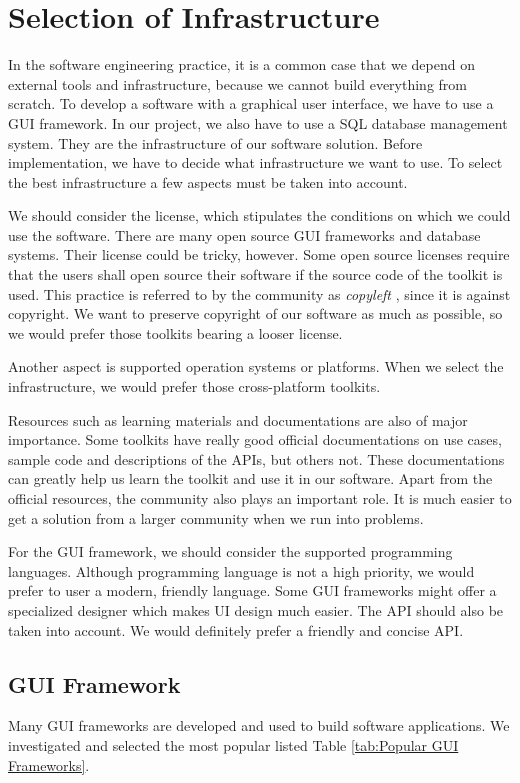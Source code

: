 \chapter{Selection of Infrastructure\label{ch:Selection of Infrastructure}}
In the software engineering practice, it is a common case that we depend on external tools and infrastructure, because we cannot build everything from scratch. To develop a software with a graphical user interface, we have to use a GUI framework. In our project, we also have to use a SQL database management system. They are the infrastructure of our software solution. Before implementation, we have to decide what infrastructure we want to use. To select the best infrastructure a few aspects must be taken into account. 

We should consider the license, which stipulates the conditions on which we could use the software. There are many open source GUI frameworks and database systems. Their license could be tricky, however. Some open source licenses require that the users shall open source their software if the source code of the toolkit is used. This practice is referred to by the community as \textit{copyleft} \cite{copyleft}, since it is against copyright. We want to preserve copyright of our software as much as possible, so we would prefer those toolkits bearing a looser license. 

Another aspect is supported operation systems or platforms. When we select the infrastructure, we would prefer those cross-platform toolkits.

Resources such as learning materials and documentations are also of major importance. Some toolkits have really good official documentations on use cases, sample code and descriptions of the APIs, but others not. These documentations can greatly help us learn the toolkit and use it in our software. Apart from the official resources, the community also plays an important role. It is much easier to get a solution from a larger community when we run into problems.

For the GUI framework, we should consider the supported programming languages. Although programming language is not a high priority, we would prefer to user a modern, friendly language. Some GUI frameworks might offer a specialized designer which makes UI design much easier. The API should also be taken into account. We would definitely prefer a friendly and concise API.

\section{GUI Framework}
Many GUI frameworks are developed and used to build software applications. We investigated and selected the most popular listed Table \ref{tab:Popular GUI Frameworks}.

